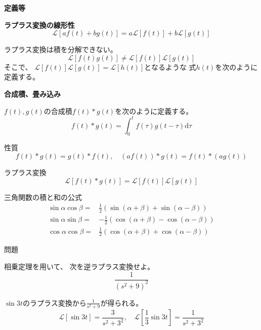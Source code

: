 \documentclass[12pt,b5paper]{ltjsarticle}
\begin{document}
\hrulefill
\textbf{定義等}
\hrulefill

\textbf{ラプラス変換の線形性}
\begin{equation}
 \mathcal{L}[af(t)+bg(t)]
  = a\mathcal{L}[f(t)] + b\mathcal{L}[g(t)]
\end{equation}


ラプラス変換は積を分解できない。
\begin{equation}
 \mathcal{L}[f(t)g(t)] \ne \mathcal{L}[f(t)]\mathcal{L}[g(t)]
\end{equation}
そこで、
$\mathcal{L}[f(t)]\mathcal{L}[g(t)]=\mathcal{L}[h(t)]$となるような
式$h(t)$を次のように定義する。

\textbf{合成積、畳み込み}

$f(t),g(t)$の合成積$f(t)*g(t)$を次のように定義する。
\begin{equation}
 f(t)*g(t) = \int_{0}^{t}f(\tau)g(t-\tau)\mathrm{d}\tau
\end{equation}


性質
\begin{equation}
 f(t)*g(t)=g(t)*f(t)
  ,\quad
 (af(t))*g(t)=f(t)*(ag(t))
\end{equation}


ラプラス変換
\begin{equation}
 \mathcal{L}[f(t)*g(t)]
  =\mathcal{L}[f(t)]\mathcal{L}[g(t)]
\end{equation}




三角関数の積と和の公式
\begin{align}
 \sin \alpha \cos \beta
 =& \frac{1}{2}\left( \sin(\alpha+\beta)+\sin(\alpha-\beta) \right)\\
 \sin \alpha \sin \beta
 =& -\frac{1}{2}\left( \cos(\alpha+\beta)-\cos(\alpha-\beta) \right)\\
 \cos \alpha \cos \beta
 =& \frac{1}{2}\left( \cos(\alpha+\beta)+\cos(\alpha-\beta) \right)
\end{align}



\hrulefill
問題
\hrulefill

相乗定理を用いて、
次を逆ラプラス変換せよ。
\begin{equation}
 \frac{1}{(s^2+9)^2}
\end{equation}


\dotfill


$\sin 3t$のラプラス変換から$\frac{1}{s^2+9}$が得られる。
\begin{equation}
 \mathcal{L}[\sin 3t] = \frac{3}{s^2+3^2}
  ,\quad
 \mathcal{L}\left[ \frac{1}{3}\sin 3t \right] = \frac{1}{s^2+3^2}
\end{equation}
\end{document}
